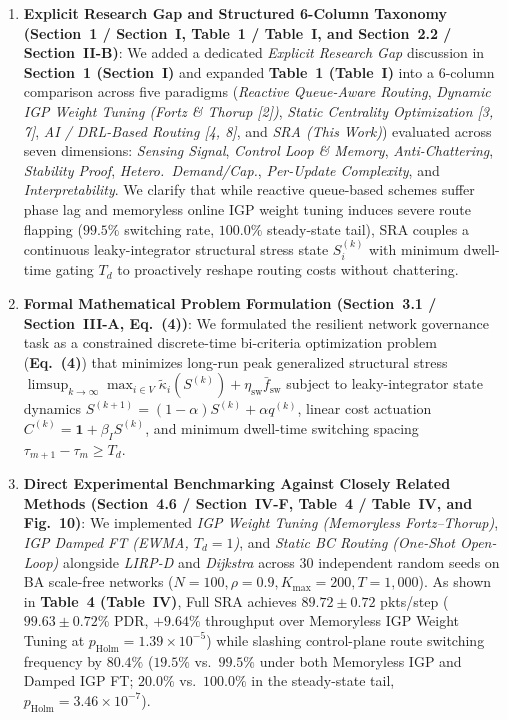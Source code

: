 \documentclass[11pt,a4paper]{article}
\begin{document}
\begin{enumerate}[leftmargin=1.8em]
    \item \textbf{Explicit Research Gap and Structured 6-Column Taxonomy (Section~1 / Section~I, Table~1 / Table~I, and Section~2.2 / Section~II-B)}: We added a dedicated \textit{Explicit Research Gap} discussion in \textbf{Section~1 (Section~I)} and expanded \textbf{Table~1 (Table~I)} into a 6-column comparison across five paradigms (\textit{Reactive Queue-Aware Routing}, \textit{Dynamic IGP Weight Tuning (Fortz \& Thorup [2])}, \textit{Static Centrality Optimization [3, 7]}, \textit{AI / DRL-Based Routing [4, 8]}, and \textit{SRA (This Work)}) evaluated across seven dimensions: \textit{Sensing Signal}, \textit{Control Loop \& Memory}, \textit{Anti-Chattering}, \textit{Stability Proof}, \textit{Hetero.\ Demand/Cap.}, \textit{Per-Update Complexity}, and \textit{Interpretability}. We clarify that while reactive queue-based schemes suffer phase lag and memoryless online IGP weight tuning induces severe route flapping ($99.5\%$ switching rate, $100.0\%$ steady-state tail), SRA couples a continuous leaky-integrator structural stress state $S_i^{(k)}$ with minimum dwell-time gating $T_d$ to proactively reshape routing costs without chattering.
    \item \textbf{Formal Mathematical Problem Formulation (Section~3.1 / Section~III-A, Eq.~(4))}: We formulated the resilient network governance task as a constrained discrete-time bi-criteria optimization problem (\textbf{Eq.~(4)}) that minimizes long-run peak generalized structural stress $\limsup_{k\to\infty}\max_{i\in V}\widetilde{\kappa}_i(S^{(k)}) + \eta_{\text{sw}}\bar{f}_{\text{sw}}$ subject to leaky-integrator state dynamics $S^{(k+1)}=(1-\alpha)S^{(k)}+\alpha q^{(k)}$, linear cost actuation $C^{(k)}=\mathbf{1}+\beta_I S^{(k)}$, and minimum dwell-time switching spacing $\tau_{m+1}-\tau_m \ge T_d$.
    \item \textbf{Direct Experimental Benchmarking Against Closely Related Methods (Section~4.6 / Section~IV-F, Table~4 / Table~IV, and Fig.~10)}: We implemented \textit{IGP Weight Tuning (Memoryless Fortz--Thorup)}, \textit{IGP Damped FT (EWMA, $T_d=1$)}, and \textit{Static BC Routing (One-Shot Open-Loop)} alongside \textit{LIRP-D} and \textit{Dijkstra} across 30 independent random seeds on BA scale-free networks ($N=100, \rho=0.9, K_{\max}=200, T=1{,}000$). As shown in \textbf{Table~4 (Table~IV)}, Full SRA achieves $89.72 \pm 0.72$ pkts/step ($99.63 \pm 0.72\%$ PDR, $+9.64\%$ throughput over Memoryless IGP Weight Tuning at $p_{\text{Holm}}=1.39 \times 10^{-5}$) while slashing control-plane route switching frequency by \textbf{$80.4\%$} ($19.5\%$ vs.\ $99.5\%$ under both Memoryless IGP and Damped IGP FT; $20.0\%$ vs.\ $100.0\%$ in the steady-state tail, $p_{\text{Holm}}=3.46 \times 10^{-7}$).
\end{enumerate}
\end{document}
